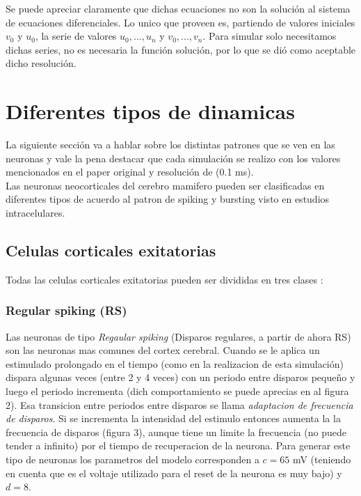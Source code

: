 \documentclass[12pt]{article}
\begin{document}
Se puede apreciar claramente que dichas ecuaciones no son la solución al sistema de ecuaciones diferenciales. Lo unico que proveen es, partiendo de valores iniciales $v_0$ y $u_0$,
la serie de valores $u_0,...,u_n$ y $v_0,...,v_n$. Para simular solo necesitamos dichas series, no es necesaria la función solución, por lo que se dió como aceptable dicho resolución.

\section{Diferentes tipos de dinamicas}

La siguiente sección va a hablar sobre los distintas patrones que se ven en las neuronas y vale la pena destacar que cada simulación se realizo con los valores
mencionados en el paper original y resolución de (0.1 ms). \\

Las neuronas neocorticales del cerebro mamifero pueden ser clasificadas en diferentes tipos de acuerdo al patron de spiking y bursting visto en estudios intracelulares. \\

\subsection{Celulas corticales exitatorias}
Todas las celulas corticales exitatorias pueden ser divididas en tres clases \cite{firingPatters} \cite{chatteringCells}:

\newpage
\subsubsection{Regular spiking (RS)}
Las neuronas de tipo \textit{Regaular spiking} (Disparos regulares, a partir de ahora RS) son las neuronas mas comunes del cortex cerebral. Cuando se le aplica un estimulado prolongado en el tiempo (como en la realizacion de esta simulación)
dispara algunas veces (entre 2 y 4 veces) con un periodo entre disparos pequeño y luego el periodo incrementa (dich comportamiento se puede aprecias en al figura 2). Esa transicion entre periodos entre disparos se llama \textit{adaptacion de frecuencia de disparos}.
Si se incrementa la intensidad del estimulo entonces aumenta la la frecuencia de disparos (figura 3), aunque tiene un limite la frecuencia (no puede tender a infinito) por el tiempo de recuperacion de la neurona.
Para generar este tipo de neuronas los parametros del modelo corresponden a $c = 65$ mV (teniendo en cuenta que
es el voltaje utilizado para el reset de la neurona es muy bajo) y $d=8$.
\end{document}
